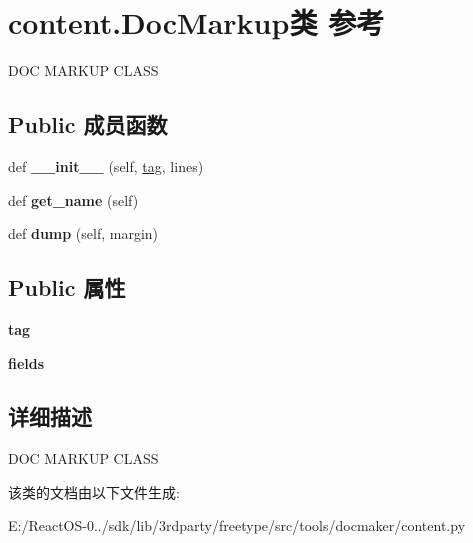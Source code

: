 \hypertarget{classcontent_1_1_doc_markup}{}\section{content.\+Doc\+Markup类 参考}
\label{classcontent_1_1_doc_markup}


D\+OC M\+A\+R\+K\+UP C\+L\+A\+SS  


\subsection*{Public 成员函数}
\begin{DoxyCompactItemize}
\item 
\mbox{\label{classcontent_1_1_doc_markup_a29288149fdba6e4869e72b78c303631e}} 
def {\bfseries \+\_\+\+\_\+init\+\_\+\+\_\+} (self, \hyperlink{structtag}{tag}, lines)
\item 
\mbox{\label{classcontent_1_1_doc_markup_a9aebb4cf36988caf3c684c61d0597484}} 
def {\bfseries get\+\_\+name} (self)
\item 
\mbox{\label{classcontent_1_1_doc_markup_ab095d5586df9e8aa4e57b6855235c478}} 
def {\bfseries dump} (self, margin)
\end{DoxyCompactItemize}
\subsection*{Public 属性}
\begin{DoxyCompactItemize}
\item 
\mbox{\label{classcontent_1_1_doc_markup_adbe62e8494f112370edde715f9ef5f3a}} 
{\bfseries tag}
\item 
\mbox{\label{classcontent_1_1_doc_markup_a66ea52dc701542dbd77dfaab4cd79dda}} 
{\bfseries fields}
\end{DoxyCompactItemize}


\subsection{详细描述}
D\+OC M\+A\+R\+K\+UP C\+L\+A\+SS 

该类的文档由以下文件生成\+:\begin{DoxyCompactItemize}
\item 
E\+:/\+React\+O\+S-\/0../sdk/lib/3rdparty/freetype/src/tools/docmaker/content.\+py\end{DoxyCompactItemize}
